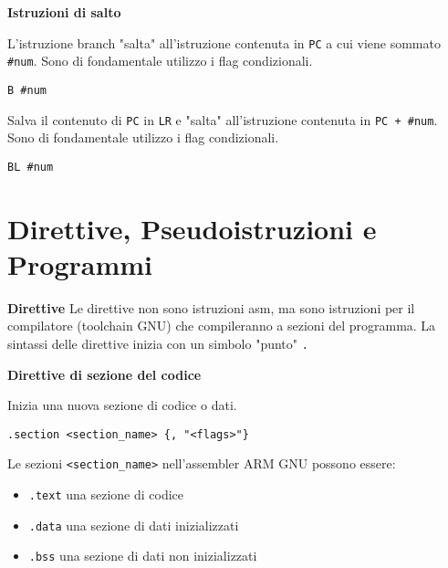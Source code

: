 \begin{defn}
	\textbf{Istruzioni di salto}
	
	L'istruzione branch "salta" all'istruzione contenuta in \verb|PC|  a cui viene sommato \verb|#num|. Sono di fondamentale utilizzo i flag condizionali.
	\begin{lstlisting}[style=arm]
	B #num
	\end{lstlisting}
	
	Salva il contenuto di \verb|PC| in \verb|LR| e "salta" all'istruzione contenuta in \verb|PC + #num|. Sono di fondamentale utilizzo i flag condizionali.
	\begin{lstlisting}[style=arm]
	BL #num
	\end{lstlisting}
\end{defn}

\section{Direttive, Pseudoistruzioni e Programmi}

\begin{defn}
	\textbf{Direttive}
	Le direttive non sono istruzioni asm, ma sono istruzioni per il compilatore (toolchain GNU) che compileranno a sezioni del programma. La sintassi delle direttive inizia con un simbolo "punto" \verb|.|
\end{defn}

\begin{defn}
	\textbf{Direttive di sezione del codice}
	
	Inizia una nuova sezione di codice o dati.
	\begin{lstlisting}[style=arm]
	.section <section_name> {, "<flags>"}
	\end{lstlisting}
	
	Le sezioni \verb|<section_name>| nell'assembler ARM GNU possono essere:
	\begin{itemize}
		\item \verb|.text| una sezione di codice
		\item \verb|.data| una sezione di dati inizializzati
		\item \verb|.bss| una sezione di dati non inizializzati
	\end{itemize}
\end{defn}

